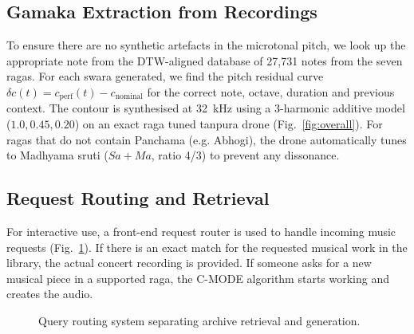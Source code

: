 \documentclass[conference,letterpaper]{IEEEtran}
\newcounter{algorithm}
\begin{document}
\subsection{Gamaka Extraction from Recordings}
To ensure there are no synthetic artefacts in the microtonal pitch, we look up the appropriate note from the DTW-aligned database of 27,731 notes from the seven ragas. For each swara generated, we find the pitch residual curve $\delta c(t) = c_{\text{perf}}(t) - c_{\text{nominal}}$ for the correct note, octave, duration and previous context. The contour is synthesised at 32~kHz using a 3-harmonic additive model ($1.0, 0.45, 0.20$) on an exact raga tuned tanpura drone (Fig.~\ref{fig:overall}). For ragas that do not contain Panchama (e.g. Abhogi), the drone automatically tunes to Madhyama sruti ($Sa + Ma$, ratio 4/3) to prevent any dissonance.

\subsection{Request Routing and Retrieval}
For interactive use, a front-end request router is used to handle incoming music requests (Fig.~\ref{fig:router}). If there is an exact match for the requested musical work in the library, the actual concert recording is provided. If someone asks for a new musical piece in a supported raga, the C-MODE algorithm starts working and creates the audio.

\begin{figure}[t]
\centering
{}
\caption{Query routing system separating archive retrieval and generation.}
\label{fig:router}
\end{figure}
\end{document}
